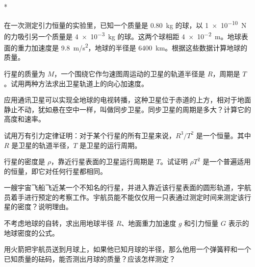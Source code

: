 \begin{Exercise}*
\begin{question}
	\item 在一次测定引力恒量的实验里，已知一个质量是 \qty{0.80}{kg} 的球，以 \qty{1e-10}{N} 的力吸引另一个质量是 \qty{4e-3}{kg} 的球。这两个球相距 \qty{4e-2}{m}。地球表面的重力加速度是 \qty{9.8}{m/s^2}，地球的半径是 \qty{6400}{km}。根据这些数据计算地球的质量。
	\item 行星的质量为 $M$，一个围绕它作匀速图周运动的卫星的轨道半径是 $R$，周期是 $T$。试用两种方法求出卫星轨道上的向心加速度。	
	\item 应用通讯卫星可以实现全地球的电视转播，这种卫星位于赤道的上方，相对于地面静止不动，犹如悬在空中一样，叫做同步卫星。同步卫星的周期是多大？计算它的高度和速率。
	\item 试用万有引力定律证明：对于某个行星的所有卫星来说，$R^3/T^2$ 是一个恒量。其中 $R$ 是卫星的轨道半径，$T$ 是卫星的运行周期。
	\item 行星的密度是 $\rho$，靠近行星表面的卫星运行周期是 $T$。试证明 $\rho T^2$ 是一个普遍适用的恒量，即它对任何行星都相同。
	\item 一艘宇宙飞船飞近某一个不知名的行星，并进入靠近该行星表面的圆形轨道，宇航员着手进行预定的考察工作。宇航员能不能仅仅用一只表通过测定时间来测定该行星的密度？说明理由。
	\item 不考虑地球的自转，求出用地球半径 $R$、地面重力加速度 $g$ 和引力恒量 $G$ 表示的地球密度的公式。
	\item 用火箭把宇航员送到月球上，如果他已知月球的半径，那么他用一个弹簧秤和一个已知质量的砝码，能否测出月球的质量？应该怎样测定？	
\end{question}
\end{Exercise}